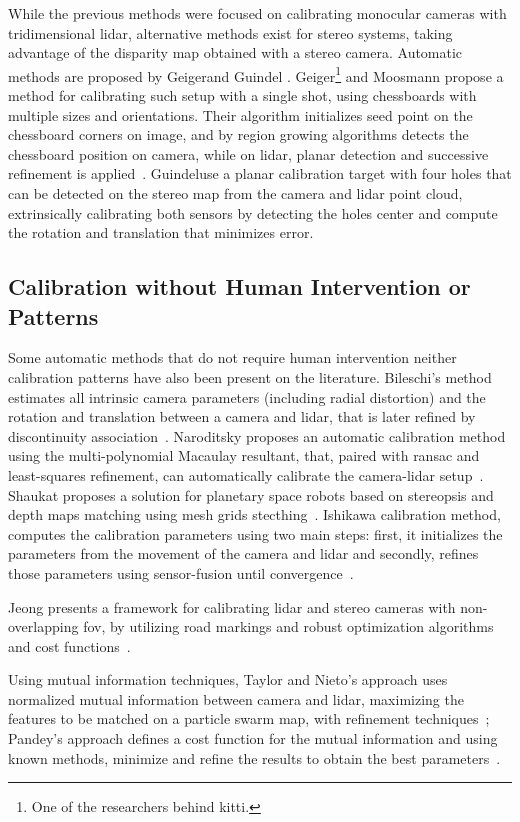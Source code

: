 While the previous methods were focused on calibrating monocular cameras with tridimensional \ac{lidar}, alternative methods exist for stereo systems, taking advantage of the disparity map obtained with a stereo camera. Automatic methods are proposed by Geiger\etal and Guindel \etal. Geiger\footnote{One of the researchers behind \ac{kitti}.} and Moosmann propose a method for calibrating such setup with a single shot, using chessboards with multiple sizes and orientations. Their algorithm initializes seed point on the chessboard corners on image, and by region growing algorithms detects the chessboard position on camera, while on \ac{lidar}, planar detection and successive refinement is applied~\cite{Geiger2012a}. Guindel\etal use a planar calibration target with four holes that can be detected on the stereo map from the camera and \ac{lidar} point cloud, extrinsically calibrating both sensors by detecting the holes center and compute the rotation and translation that minimizes error. 

\subsection{Calibration without Human Intervention or Patterns}
Some automatic methods that do not require human intervention neither calibration patterns have also been present on the literature. Bileschi's method estimates all intrinsic camera parameters  (including radial distortion) and the rotation and translation between a camera and \ac{lidar}, that is later refined by discontinuity association~\cite{Bileschi2009}. Naroditsky \etal proposes an automatic calibration method using the multi-polynomial Macaulay resultant, that, paired with \ac{ransac} and least-squares refinement, can automatically calibrate the camera-\ac{lidar} setup~\cite{Naroditsky2011}. Shaukat proposes a solution for planetary space robots based on  stereopsis and depth maps matching using mesh grids stecthing~\cite{Shaukat2016}. Ishikawa \etal calibration method, computes the calibration parameters using two main steps: first, it initializes the parameters from the movement of the camera and \ac{lidar} and secondly, refines those parameters using sensor-fusion until convergence~\cite{Ishikawa2018}. 

Jeong \etal presents a framework for calibrating \ac{lidar} and stereo cameras with non-overlapping \ac{fov}, by utilizing road markings and robust optimization algorithms and cost functions~\cite{Jeong2019}.

Using mutual information techniques, Taylor and Nieto's approach uses normalized mutual information between camera and \ac{lidar}, maximizing the features to be matched on a particle swarm map, with refinement techniques~\cite{Taylor2013}; Pandey's \etal approach defines a cost function for the mutual information and using known methods, minimize and refine the results to obtain the best parameters~\cite{Pandey2012}.



